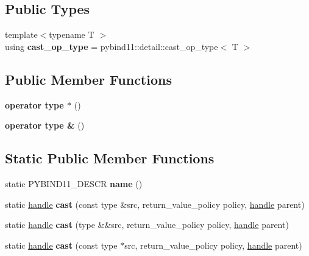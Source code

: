 \subsection*{Public Types}
\begin{DoxyCompactItemize}
\item 
{\footnotesize template$<$typename T $>$ }\\using {\bfseries cast\+\_\+op\+\_\+type} = pybind11\+::detail\+::cast\+\_\+op\+\_\+type$<$ T $>$\hypertarget{classtype__caster__base_aaaf39284266ad9611dd83d30234ef4f5}{}\label{classtype__caster__base_aaaf39284266ad9611dd83d30234ef4f5}

\end{DoxyCompactItemize}
\subsection*{Public Member Functions}
\begin{DoxyCompactItemize}
\item 
{\bfseries operator type $\ast$} ()\hypertarget{classtype__caster__base_af769985fa046b4313de71b2ec32a3c32}{}\label{classtype__caster__base_af769985fa046b4313de71b2ec32a3c32}

\item 
{\bfseries operator type \&} ()\hypertarget{classtype__caster__base_a277a432ee25a317c1d2d829e6c8542e8}{}\label{classtype__caster__base_a277a432ee25a317c1d2d829e6c8542e8}

\end{DoxyCompactItemize}
\subsection*{Static Public Member Functions}
\begin{DoxyCompactItemize}
\item 
static P\+Y\+B\+I\+N\+D11\+\_\+\+D\+E\+S\+CR {\bfseries name} ()\hypertarget{classtype__caster__base_ab33c70af4ac76cf1af4c7af37690ff77}{}\label{classtype__caster__base_ab33c70af4ac76cf1af4c7af37690ff77}

\item 
static \hyperlink{classhandle}{handle} {\bfseries cast} (const type \&src, return\+\_\+value\+\_\+policy policy, \hyperlink{classhandle}{handle} parent)\hypertarget{classtype__caster__base_a8f4e5245af4e07dd1eb32c13fb085495}{}\label{classtype__caster__base_a8f4e5245af4e07dd1eb32c13fb085495}

\item 
static \hyperlink{classhandle}{handle} {\bfseries cast} (type \&\&src, return\+\_\+value\+\_\+policy policy, \hyperlink{classhandle}{handle} parent)\hypertarget{classtype__caster__base_a46fc9dadfb34be51aac1eb25d53e89eb}{}\label{classtype__caster__base_a46fc9dadfb34be51aac1eb25d53e89eb}

\item 
static \hyperlink{classhandle}{handle} {\bfseries cast} (const type $\ast$src, return\+\_\+value\+\_\+policy policy, \hyperlink{classhandle}{handle} parent)\hypertarget{classtype__caster__base_a9c4a5a2257cb15960e3f0a5b91f05657}{}\label{classtype__caster__base_a9c4a5a2257cb15960e3f0a5b91f05657}

\end{DoxyCompactItemize}
